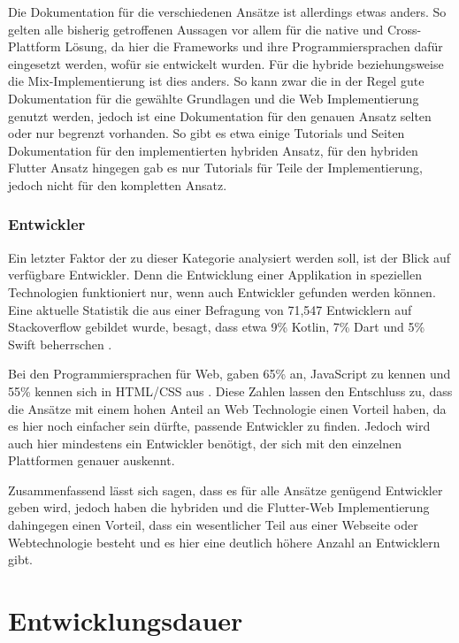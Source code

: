 Die Dokumentation für die verschiedenen Ansätze ist allerdings etwas anders. So gelten alle bisherig getroffenen Aussagen vor allem für die native und Cross-Plattform Lösung, da hier die Frameworks und ihre Programmiersprachen dafür eingesetzt werden, wofür sie entwickelt wurden. Für die hybride beziehungsweise die Mix-Implementierung ist dies anders. So kann zwar die in der Regel gute Dokumentation für die gewählte Grundlagen und die Web Implementierung genutzt werden, jedoch ist eine Dokumentation für den genauen Ansatz selten oder nur begrenzt vorhanden. So gibt es etwa einige Tutorials und Seiten Dokumentation für den implementierten hybriden Ansatz, für den hybriden Flutter Ansatz hingegen gab es nur Tutorials für Teile der Implementierung, jedoch nicht für den kompletten Ansatz. 

\subsubsection{Entwickler}
Ein letzter Faktor der zu dieser Kategorie analysiert werden soll, ist der Blick auf verfügbare Entwickler. Denn die Entwicklung einer Applikation in speziellen Technologien funktioniert nur, wenn auch Entwickler gefunden werden können. Eine aktuelle Statistik die aus einer Befragung von 71,547 Entwicklern auf Stackoverflow gebildet wurde, besagt, dass etwa 9\% Kotlin, 7\% Dart und 5\% Swift beherrschen \cite{statist_used_programming_languages}.

Bei den Programmiersprachen für Web, gaben  65\% an, JavaScript zu kennen und 55\% kennen sich in  HTML/CSS aus \cite{statist_used_programming_languages}. Diese Zahlen lassen den Entschluss zu, dass die Ansätze mit einem hohen Anteil an Web Technologie einen Vorteil haben, da es hier noch einfacher sein dürfte, passende Entwickler zu finden. Jedoch wird auch hier mindestens ein Entwickler benötigt, der sich mit den einzelnen Plattformen genauer auskennt.

Zusammenfassend lässt sich sagen, dass es für alle Ansätze genügend Entwickler geben wird, jedoch haben die hybriden und die Flutter-Web Implementierung dahingegen einen Vorteil, dass ein wesentlicher Teil aus einer Webseite oder Webtechnologie besteht und es hier eine deutlich höhere Anzahl an Entwicklern gibt.

\section{Entwicklungsdauer}

